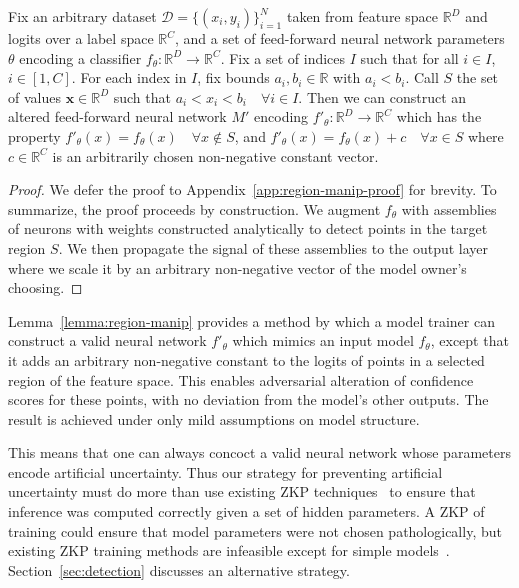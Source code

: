 \sloppy
\begin{lemma} \label{lemma:region-manip}
     Fix an arbitrary dataset $\mathcal{D}=\{(x_i, y_i)\}^{N}_{i=1}$ taken from feature space $\mathbb{R}^D$ and logits over a label space $\mathbb{R}^{C}$, and a set of feed-forward neural network parameters $\theta$ encoding a classifier $f_{\theta}: \mathbb{R}^D \to \mathbb{R}^C$. Fix a set of indices $I$ such that for all $i \in I$, $i \in [1, C]$. For each index in $I$, fix bounds $a_i, b_i \in \mathbb{R}$ with $a_i < b_i$. Call $S$ the set of values $\mathbf{x} \in \mathbb{R}^D$ such that $a_i < x_i < b_i \quad \forall i \in I$. Then we can construct an altered feed-forward neural network $M'$ encoding $f'_{\theta}: \mathbb{R}^D \to \mathbb{R}^C$ which has the property $f'_{\theta}(x) = f_{\theta}(x) \quad \forall x \notin S$, and $f'_\theta(x)=f_\theta(x) + c \quad \forall x \in S$ where $c \in \mathbb{R}^C$ is an arbitrarily chosen non-negative constant vector.
\end{lemma} 

\begin{proof} We defer the proof to Appendix~\ref{app:region-manip-proof} for brevity. To summarize, the proof proceeds by construction. We augment $f_{\theta}$ with assemblies of neurons with weights constructed analytically to detect points in the target region $S$. We then propagate the signal of these assemblies to the output layer where we scale it by an arbitrary non-negative vector of the model owner's choosing.
\end{proof}

Lemma~\ref{lemma:region-manip} provides a method by which a model trainer can construct a valid neural network $f'_{\theta}$ which mimics an input model $f_{\theta}$, except that it adds an arbitrary non-negative constant to the logits of points in a selected region of the feature space. This enables adversarial alteration of confidence scores for these points, with no deviation from the model's other outputs. The result is achieved under only mild assumptions on model structure.


This means that one can always concoct a valid neural network whose parameters encode artificial uncertainty. Thus our strategy for preventing artificial uncertainty must do more than use existing ZKP techniques~\cite{weng2021mystique,sun2024zkllm} to ensure that inference was computed correctly given a set of hidden parameters. A ZKP of training could ensure that model parameters were not chosen pathologically, but existing ZKP training methods are infeasible except for simple models~\cite{garg2023experimenting}. Section~\ref{sec:detection} discusses an alternative strategy.

